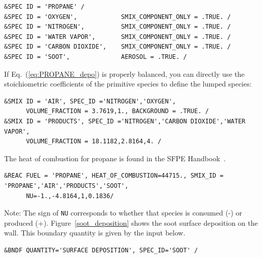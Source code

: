 \documentclass[11pt]{book}
\newcommand{\ct}{\tt\small}
\begin{document}
\footnotesize
\begin{verbatim}
&SPEC ID = 'PROPANE' /
&SPEC ID = 'OXYGEN',            SMIX_COMPONENT_ONLY = .TRUE. /
&SPEC ID = 'NITROGEN',          SMIX_COMPONENT_ONLY = .TRUE. /
&SPEC ID = 'WATER VAPOR',       SMIX_COMPONENT_ONLY = .TRUE. /
&SPEC ID = 'CARBON DIOXIDE',    SMIX_COMPONENT_ONLY = .TRUE. /
&SPEC ID = 'SOOT',              AEROSOL = .TRUE. /
\end{verbatim} \normalsize

\noindent
If Eq.~(\ref{eq:PROPANE_depo}) is properly balanced, you can directly use the stoichiometric coefficients of the primitive species to define the lumped species:

\footnotesize
\begin{verbatim}
&SMIX ID = 'AIR', SPEC_ID ='NITROGEN','OXYGEN',
      VOLUME_FRACTION = 3.7619,1., BACKGROUND = .TRUE. /
&SMIX ID = 'PRODUCTS', SPEC_ID ='NITROGEN','CARBON DIOXIDE','WATER VAPOR',
      VOLUME_FRACTION = 18.1182,2.8164,4. /
\end{verbatim} \normalsize

\noindent
The heat of combustion for propane is found in the SFPE Handbook~\cite{SFPE:Tewarson}.

\footnotesize
\begin{verbatim}
&REAC FUEL = 'PROPANE', HEAT_OF_COMBUSTION=44715., SMIX_ID = 'PROPANE','AIR','PRODUCTS','SOOT',
      NU=-1.,-4.8164,1,0.1836/
\end{verbatim} \normalsize

\noindent
Note: The sign of {\ct NU} corresponds to whether that species is consumed (-) or produced (+). Figure~\ref{soot_deposition} shows the soot surface deposition on the wall.  This boundary quantity is given by the input below.

\footnotesize
\begin{verbatim}
&BNDF QUANTITY='SURFACE DEPOSITION', SPEC_ID='SOOT' /
\end{verbatim} \normalsize
\end{document}
